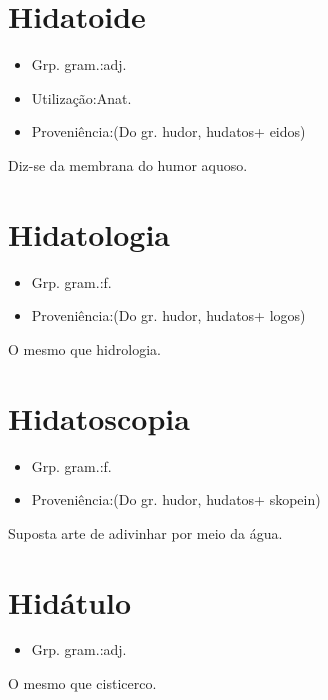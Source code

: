 \documentclass{article}
\begin{document}
\section{Hidatoide}
\begin{itemize}
\item {Grp. gram.:adj.}
\end{itemize}
\begin{itemize}
\item {Utilização:Anat.}
\end{itemize}
\begin{itemize}
\item {Proveniência:(Do gr. \textunderscore hudor\textunderscore , \textunderscore hudatos\textunderscore  + \textunderscore eidos\textunderscore )}
\end{itemize}
Diz-se da membrana do humor aquoso.
\section{Hidatologia}
\begin{itemize}
\item {Grp. gram.:f.}
\end{itemize}
\begin{itemize}
\item {Proveniência:(Do gr. \textunderscore hudor\textunderscore , \textunderscore hudatos\textunderscore  + \textunderscore logos\textunderscore )}
\end{itemize}
O mesmo que \textunderscore hidrologia\textunderscore .
\section{Hidatoscopia}
\begin{itemize}
\item {Grp. gram.:f.}
\end{itemize}
\begin{itemize}
\item {Proveniência:(Do gr. \textunderscore hudor\textunderscore , \textunderscore hudatos\textunderscore  + \textunderscore skopein\textunderscore )}
\end{itemize}
Suposta arte de adivinhar por meio da água.
\section{Hidátulo}
\begin{itemize}
\item {Grp. gram.:adj.}
\end{itemize}
O mesmo que \textunderscore cisticerco\textunderscore .
\end{document}
